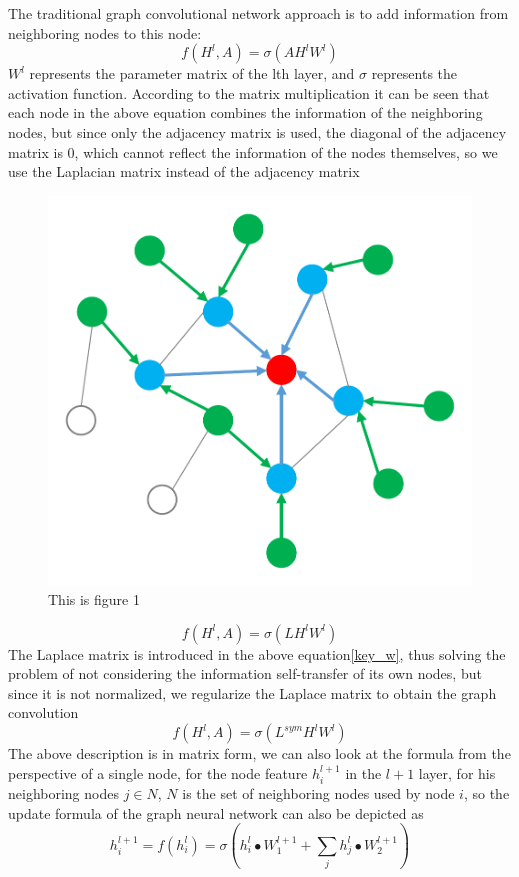 \documentclass[%
reprint,
amsmath,amssymb,
aps,
]{revtex4-2}
\begin{document}
	The traditional graph convolutional network approach is to add information from neighboring nodes to this node:
	\begin{equation}\label{key}
		f(H^l,A) = \sigma(A H^l W^l)
	\end{equation}
	$W^l$ represents the parameter matrix of the lth layer, and $\sigma$ represents the activation function. According to the matrix multiplication it can be seen that each node in the above equation combines the information of the neighboring nodes, but since only the adjacency matrix is used, the diagonal of the adjacency matrix is 0, which cannot reflect the information of the nodes themselves, so we use the Laplacian matrix instead of the adjacency matrix
	\begin{figure}
		\centering
		\includegraphics[scale=0.5]{GNN}
		\caption{This is figure 1}
		\label{fig:gnn}
	\end{figure}
	\begin{equation}\label{key_w}
		f(H^l,A) = \sigma(L H^l W^l)
	\end{equation}
	The Laplace matrix is introduced in the above equation\eqref{key_w}, thus solving the problem of not considering the information self-transfer of its own nodes, but since it is not normalized, we regularize the Laplace matrix to obtain the graph convolution
	\begin{equation}\label{LapalceMatrix}
	f(H^l,A) = \sigma(L^{sym} H^l W^l)	
	\end{equation}
	The above description is in matrix form, we can also look at the formula from the perspective of a single node, for the node feature $h^{l+1}_i$ in the $l+1$ layer, for his neighboring nodes $j \in N$, $N$ is the set of neighboring nodes used by node $i$, so the update formula of the graph neural network can also be depicted as
	\begin{equation}\label{formulaNode}
		h^{l+1}_i = f(h^{l}_i) = \sigma(h^{l}_i \bullet W_1^{l+1} + \sum_j h^{l}_j \bullet W^{l+1}_2)
	\end{equation}
\end{document}
